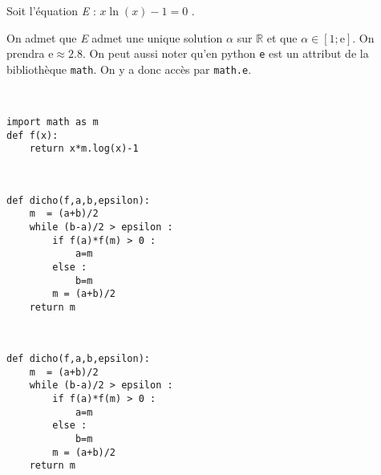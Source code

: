 
\ifprof
\else
Soit l'équation \emph{E} : \quad $x\ln(x)-1=0$ .

On admet que \emph{E} admet une unique solution $\alpha$ sur $\mathbb R$ et que
$\alpha\in[1;\text{e}]$. On prendra e$\approx2.8$. On peut aussi noter qu'en python \texttt{e} est un attribut de la bibliothèque \texttt{math}. On y a donc accès par \texttt{math.e}.
\fi

\ifprof
\begin{corrige}~\\ \vspace{-.5cm}
\begin{lstlisting}
import math as m
def f(x):
    return x*m.log(x)-1
\end{lstlisting}
\end{corrige}
\else
\fi

\ifprof
\begin{corrige}~\\ \vspace{-.5cm}
\begin{lstlisting}
def dicho(f,a,b,epsilon):
    m  = (a+b)/2
    while (b-a)/2 > epsilon :
        if f(a)*f(m) > 0 :
            a=m
        else :
            b=m
        m = (a+b)/2
    return m 
\end{lstlisting}
\end{corrige}
\else
\fi


\ifprof
\begin{corrige}~\\ \vspace{-.5cm}
\begin{lstlisting}
def dicho(f,a,b,epsilon):
    m  = (a+b)/2
    while (b-a)/2 > epsilon :
        if f(a)*f(m) > 0 :
            a=m
        else :
            b=m
        m = (a+b)/2
    return m 
\end{lstlisting}
\end{corrige}
\else
\fi

